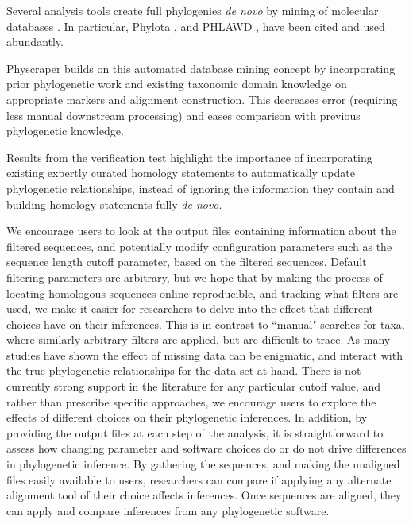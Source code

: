 \documentclass{bmcart}
\begin{document}
Several analysis tools create full phylogenies \textit{de novo} by mining of molecular
databases \cite{antonelli2017toward, sanderson2008phylota, smith2019pyphlawd,
bennett2018phylotar, pearse2013phylogenerator}.
In particular, Phylota \cite{sanderson2008phylota},
and PHLAWD \cite{smith2009mega}, have been cited and used abundantly.

Physcraper builds on this automated database mining concept by incorporating prior
phylogenetic work and existing taxonomic domain knowledge on appropriate markers
and alignment construction.
This decreases error (requiring less manual downstream processing) and
eases comparison with previous phylogenetic knowledge.

Results from the verification test highlight the importance of incorporating existing expertly
curated homology statements to automatically update phylogenetic relationships, instead
of ignoring the information they contain and building homology statements fully \textit{de novo}.

We encourage users to look at the output files containing information about the
filtered sequences, and potentially modify configuration parameters such as the
sequence length cutoff parameter, based on the filtered sequences.
Default filtering parameters are arbitrary, but we hope that by making the process
of locating homologous sequences online reproducible, and tracking what filters
are used, we make it easier for researchers to delve into the effect that different
choices have on their inferences.
This is in contrast to ``manual" searches for taxa, where similarly arbitrary filters
are applied, but are difficult to trace.
As many studies have shown \cite{huang_what_2009} the effect of missing data can
be enigmatic, and interact with the true phylogenetic relationships for the data
set at hand.
There is not currently strong support in the literature for any particular cutoff
value, and rather than prescribe specific approaches, we encourage users to explore
the effects of different choices on their phylogenetic inferences.
In addition, by providing the output files at each step of the analysis,
it is straightforward to assess how changing parameter and software choices do or
do not drive differences in phylogenetic inference.
By gathering the sequences, and making the unaligned files easily available to users,
researchers can compare if applying any alternate alignment tool of their choice
affects inferences.
Once sequences are aligned, they can apply and compare inferences from any phylogenetic
software.
\end{document}
